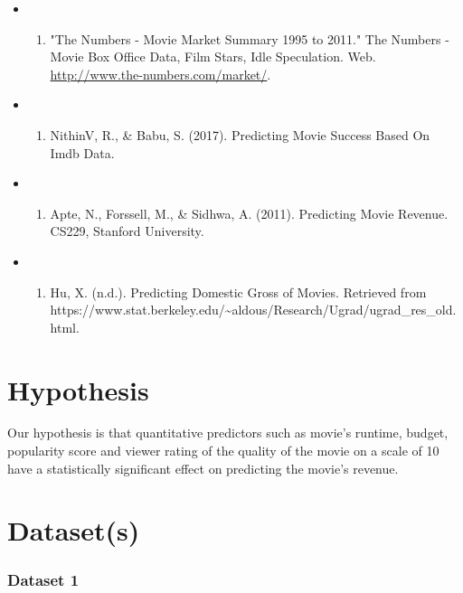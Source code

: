 \documentclass[11pt]{article}
\providecommand{\tightlist}{%
      \setlength{\itemsep}{0pt}\setlength{\parskip}{0pt}}
\begin{document}
\begin{itemize}
\item
  \begin{enumerate}
  \def\labelenumi{\arabic{enumi})}
  \tightlist
  \item
    "The Numbers - Movie Market Summary 1995 to 2011." The Numbers -
    Movie Box Office Data, Film Stars, Idle Speculation. Web.
    \url{http://www.the-numbers.com/market/}.
  \end{enumerate}
\item
  \begin{enumerate}
  \def\labelenumi{\arabic{enumi})}
  \setcounter{enumi}{1}
  \tightlist
  \item
    NithinV, R., \& Babu, S. (2017). Predicting Movie Success Based On
    Imdb Data.
  \end{enumerate}
\item
  \begin{enumerate}
  \def\labelenumi{\arabic{enumi})}
  \setcounter{enumi}{2}
  \tightlist
  \item
    Apte, N., Forssell, M., \& Sidhwa, A. (2011). Predicting Movie
    Revenue. CS229, Stanford University.
  \end{enumerate}
\item
  \begin{enumerate}
  \def\labelenumi{\arabic{enumi})}
  \setcounter{enumi}{3}
  \tightlist
  \item
    Hu, X. (n.d.). Predicting Domestic Gross of Movies. Retrieved from
    https://www.stat.berkeley.edu/\textasciitilde{}aldous/Research/Ugrad/ugrad\_res\_old.html.
  \end{enumerate}
\end{itemize}

    \section{Hypothesis}\label{hypothesis}

    Our hypothesis is that quantitative predictors such as movie's runtime,
budget, popularity score and viewer rating of the quality of the movie
on a scale of 10 have a statistically significant effect on predicting
the movie's revenue.

    \section{Dataset(s)}\label{datasets}

    \subsubsection{Dataset 1}\label{dataset-1}
\end{document}
